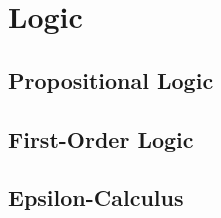 \chapter{Logic}
\section{Propositional Logic}

\section{First-Order Logic}

\section{Epsilon-Calculus}

